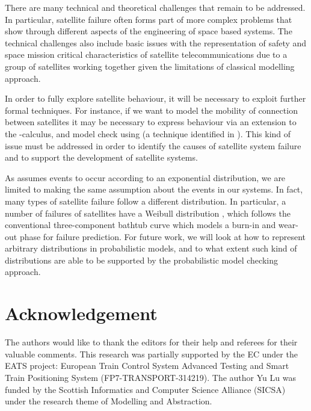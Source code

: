 \documentclass[preprint,12pt]{qrei}
\begin{document}
There are many technical and theoretical challenges that remain to be addressed. In particular, satellite failure often forms part of more complex problems that show through different aspects of the engineering of space based systems. The technical challenges also include basic issues with the representation of safety and space mission critical characteristics of satellite telecommunications due to a group of satellites working together given the limitations of classical modelling approach.

In order to fully explore satellite behaviour, it will be necessary to exploit further formal techniques. For instance, if we want to model the mobility of connection between satellites it may be necessary to express behaviour via an extension to the -calculus, and model check using  (a technique identified in \cite{NPP+09}). This kind of issue must be addressed in order to identify the causes of satellite system failure and to support the development of satellite systems.

As  assumes events to occur according to an exponential distribution, we are limited to making the same assumption about the events in our systems. In fact, many types of satellite failure follow a different distribution. In particular, a number of failures of satellites have a Weibull distribution \cite{Bir10}, which follows the conventional three-component bathtub curve which models a burn-in and wear-out phase for failure prediction. For future work, we will look at how to represent arbitrary distributions in probabilistic models, and to what extent such kind of distributions are able to be supported by the probabilistic model checking approach.



\section*{Acknowledgement}

The authors would like to thank the editors for their help and referees for their valuable comments. This research was partially supported by the EC under the EATS project: European Train Control System Advanced Testing and Smart Train Positioning System (FP7-TRANSPORT-314219). The author Yu Lu was funded by the Scottish Informatics and Computer Science Alliance (SICSA) under the research theme of Modelling and Abstraction.





\clearpage
\end{document}
